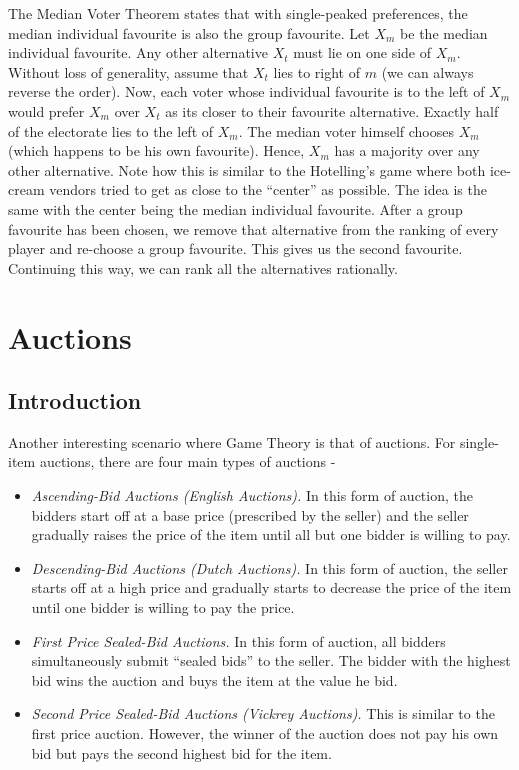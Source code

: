 \documentclass{article}
\theoremstyle{definition}
\begin{document}
The Median Voter Theorem states that with single-peaked preferences, the median individual favourite is also the group favourite. Let $X_m$ be the median individual favourite. Any other alternative $X_t$ must lie on one side of $X_m$. Without loss of generality, assume that $X_t$ lies to right of $m$ (we can always reverse the order). Now, each voter whose individual favourite is to the left of $X_m$ would prefer $X_m$ over $X_t$ as its closer to their favourite alternative. Exactly half of the electorate lies to the left of $X_m$. The median voter himself chooses $X_m$ (which happens to be his own favourite). Hence, $X_m$ has a majority over any other alternative. Note how this is similar to the Hotelling's game where both ice-cream vendors tried to get as close to the ``center'' as possible. The idea is the same with the center being the median individual favourite. After a group favourite has been chosen, we remove that alternative from the ranking of every player and re-choose a group favourite. This gives us the second favourite. Continuing this way, we can rank all the alternatives rationally.

\section{Auctions}

\subsection{Introduction}

Another interesting scenario where Game Theory is that of auctions. For single-item auctions, there are four main types of auctions - 
\begin{itemize}
    \item \textit{Ascending-Bid Auctions (English Auctions).} In this form of auction, the bidders start off at a base price (prescribed by the seller) and the seller gradually raises the price of the item until all but one bidder is willing to pay. 
    \item \textit{Descending-Bid Auctions (Dutch Auctions).} In this form of auction, the seller starts off at a high price and gradually starts to decrease the price of the item until one bidder is willing to pay the price.
    \item \textit{First Price Sealed-Bid Auctions.} In this form of auction, all bidders simultaneously submit ``sealed bids'' to the seller. The bidder with the highest bid wins the auction and buys the item at the value he bid.
    \item \textit{Second Price Sealed-Bid Auctions (Vickrey Auctions).} This is similar to the first price auction. However, the winner of the auction does not pay his own bid but pays the second highest bid for the item.
\end{itemize}
\end{document}

